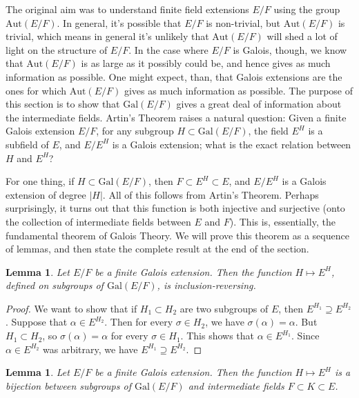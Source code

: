 \documentclass[12pt]{report}
\newtheorem{lemma}[thm]{Lemma}
\theoremstyle{definition}
\def\Aut{\text{Aut}}
\def\aa{\alpha}
\def\Gal{\text{Gal}}
\begin{document}
The original aim was to understand finite field extensions $E/F$ using the group $\Aut(E/F)$. In general, it's possible that $E/F$ is non-trivial, but $\Aut(E/F)$ is trivial, which means in general it's unlikely that $\Aut(E/F)$ will shed a lot of light on the structure of $E/F$. In the case where $E/F$ is Galois, though, we know that $\Aut(E/F)$ is as large as it possibly could be, and hence gives as much information as possible. One might expect, than, that Galois extensions are the ones for which $\Aut(E/F)$ gives as much information as possible. The purpose of this section is to show that $\Gal(E/F)$ gives a great deal of information about the intermediate fields. Artin's Theorem raises a natural question: Given a finite Galois extension $E/F$, for any subgroup $H \subset  \Gal(E/F)$, the field $E^H$ is a subfield of $E$, and $E/E^H$ is a Galois extension; what is the exact relation between $H$ and $E^H$?


For one thing, if $H \subset  \Gal(E/F)$, then $F \subset  E^H \subset  E$, and $E/E^H$ is a Galois extension of degree $|H|$. All of this follows from Artin's Theorem. Perhaps surprisingly, it turns out that this function is both injective and surjective (onto the collection of intermediate fields between $E$ and $F$). This is, essentially, the fundamental theorem of Galois Theory. We will prove this theorem as a sequence of lemmas, and then state the complete result at the end of the section.


\begin{lemma}
    Let $E/F$ be a finite Galois extension. Then the function $H \mapsto E^H$, defined on subgroups of $\Gal(E/F)$, is inclusion-reversing.
\end{lemma}

\begin{proof}
    We want to show that if $H_1 \subset H_2$ are two subgroups of $E$, then $E^{H_1}\supseteq E^{H_2}$. Suppose that $\aa\in E^{H_2}$. Then for every $\sigma\in H_2$, we have $\sigma(\aa) = \aa$. But $H_1 \subset  H_2$, so $\sigma(\aa) = \aa$ for every $\sigma\in H_1$. This shows that $\aa\in E^{H_1}$. Since $\aa\in E^{H_2}$ was arbitrary, we have $E^{H_1}\supseteq E^{H_2}$.
\end{proof}

\begin{lemma}
    Let $E/F$ be a finite Galois extension. Then the function $H \mapsto E^H$ is a bijection between subgroups of $\Gal(E/F)$ and intermediate fields $F \subset  K \subset  E$.
\end{lemma}
\end{document}

